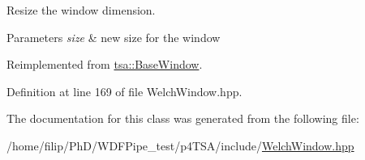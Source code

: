 Resize the window dimension.


\begin{DoxyParams}{Parameters}
{\em size} & new size for the window \\
\hline
\end{DoxyParams}


Reimplemented from \hyperlink{classtsa_1_1_base_window_a8a2a3425f2915762d50fa57dd0e04f22}{tsa\+::\+Base\+Window}.



Definition at line 169 of file Welch\+Window.\+hpp.



The documentation for this class was generated from the following file\+:\begin{DoxyCompactItemize}
\item 
/home/filip/\+Ph\+D/\+W\+D\+F\+Pipe\+\_\+test/p4\+T\+S\+A/include/\hyperlink{_welch_window_8hpp}{Welch\+Window.\+hpp}\end{DoxyCompactItemize}
